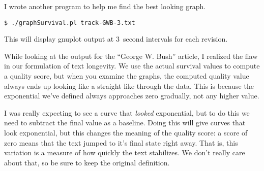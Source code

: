 I wrote another program to help me find the best looking graph.
\begin{verbatim}
$ ./graphSurvival.pl track-GWB-3.txt
\end{verbatim}
This will display gnuplot output at 3~second intervals for each revision.

While looking at the output for the ``George W. Bush'' article, I realized
the flaw in our formulation of text longevity.
We use the actual survival values to compute a quality score,
but when you examine the graphs, the computed quality value
always ends up looking like a straight like through the data.
This is because the exponential we've defined always approaches
zero gradually, not any higher value.

I was really expecting to see a curve that \textit{looked} exponential,
but to do this we need to subtract the final value as a baseline.
Doing this will give curves that look exponential, but this changes
the meaning of the quality score: a score of zero means that the text
jumped to it's final state right away.
That is, this variation is a measure of how quickly the text stabilizes.
We don't really care about that, so be sure to keep the original definition.


